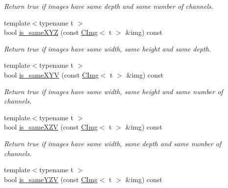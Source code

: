 \begin{DoxyCompactItemize}
\begin{DoxyCompactList}\small\item\em Return {\ttfamily true} if images have same depth and same number of channels. \end{DoxyCompactList}\item 
\hypertarget{structcimg__library_1_1_c_img_a9f3367fd377ea3f6c7312aaf2b5dad27}{{\footnotesize template$<$typename t $>$ }\\bool \hyperlink{structcimg__library_1_1_c_img_a9f3367fd377ea3f6c7312aaf2b5dad27}{is\-\_\-same\-X\-Y\-Z} (const \hyperlink{structcimg__library_1_1_c_img}{C\-Img}$<$ t $>$ \&img) const }\label{structcimg__library_1_1_c_img_a9f3367fd377ea3f6c7312aaf2b5dad27}

\begin{DoxyCompactList}\small\item\em Return {\ttfamily true} if images have same width, same height and same depth. \end{DoxyCompactList}\item 
\hypertarget{structcimg__library_1_1_c_img_aa8ae668adc5a00102b28ff4b5081448f}{{\footnotesize template$<$typename t $>$ }\\bool \hyperlink{structcimg__library_1_1_c_img_aa8ae668adc5a00102b28ff4b5081448f}{is\-\_\-same\-X\-Y\-V} (const \hyperlink{structcimg__library_1_1_c_img}{C\-Img}$<$ t $>$ \&img) const }\label{structcimg__library_1_1_c_img_aa8ae668adc5a00102b28ff4b5081448f}

\begin{DoxyCompactList}\small\item\em Return {\ttfamily true} if images have same width, same height and same number of channels. \end{DoxyCompactList}\item 
\hypertarget{structcimg__library_1_1_c_img_a90fd173ae5585567ebafc6cf3cda050c}{{\footnotesize template$<$typename t $>$ }\\bool \hyperlink{structcimg__library_1_1_c_img_a90fd173ae5585567ebafc6cf3cda050c}{is\-\_\-same\-X\-Z\-V} (const \hyperlink{structcimg__library_1_1_c_img}{C\-Img}$<$ t $>$ \&img) const }\label{structcimg__library_1_1_c_img_a90fd173ae5585567ebafc6cf3cda050c}

\begin{DoxyCompactList}\small\item\em Return {\ttfamily true} if images have same width, same depth and same number of channels. \end{DoxyCompactList}\item 
\hypertarget{structcimg__library_1_1_c_img_a9db4ba9da41e32386b8259200757bde8}{{\footnotesize template$<$typename t $>$ }\\bool \hyperlink{structcimg__library_1_1_c_img_a9db4ba9da41e32386b8259200757bde8}{is\-\_\-same\-Y\-Z\-V} (const \hyperlink{structcimg__library_1_1_c_img}{C\-Img}$<$ t $>$ \&img) const }\label{structcimg__library_1_1_c_img_a9db4ba9da41e32386b8259200757bde8}


\end{DoxyCompactItemize}

